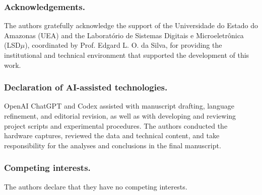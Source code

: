 \documentclass[runningheads]{llncs}
\begin{document}
\subsubsection{Acknowledgements.} The authors gratefully acknowledge the support of the Universidade do Estado do Amazonas (UEA) and the Laboratório de Sistemas Digitais e Microeletrônica (LSD$\mu$), coordinated by Prof. Edgard L. O. da Silva, for providing the institutional and technical environment that supported the development of this work.

\subsubsection{Declaration of AI-assisted technologies.} OpenAI ChatGPT and Codex assisted with manuscript drafting, language refinement, and editorial revision, as well as with developing and reviewing project scripts and experimental procedures. The authors conducted the hardware captures, reviewed the data and technical content, and take responsibility for the analyses and conclusions in the final manuscript.

\subsubsection{Competing interests.} The authors declare that they have no competing interests.
\end{document}
